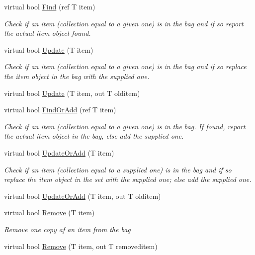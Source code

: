 \begin{DoxyCompactItemize}
virtual bool \hyperlink{class_c5_1_1_hash_bag_a596f1c7fdcc7867d3b93ffb18f106655}{Find} (ref T item)
\begin{DoxyCompactList}\small\item\em Check if an item (collection equal to a given one) is in the bag and if so report the actual item object found. \end{DoxyCompactList}\item 
virtual bool \hyperlink{class_c5_1_1_hash_bag_a261d215277e57859f6a3b0dba0f31db5}{Update} (T item)
\begin{DoxyCompactList}\small\item\em Check if an item (collection equal to a given one) is in the bag and if so replace the item object in the bag with the supplied one. \end{DoxyCompactList}\item 
virtual bool \hyperlink{class_c5_1_1_hash_bag_aa464499f571def3278fb29ffd49dc9d9}{Update} (T item, out T olditem)
\item 
virtual bool \hyperlink{class_c5_1_1_hash_bag_afc84f71f4abef8b7a96f8b5d9153a270}{Find\+Or\+Add} (ref T item)
\begin{DoxyCompactList}\small\item\em Check if an item (collection equal to a given one) is in the bag. If found, report the actual item object in the bag, else add the supplied one. \end{DoxyCompactList}\item 
virtual bool \hyperlink{class_c5_1_1_hash_bag_a7d04b71113870f6bbdd936fa778d1775}{Update\+Or\+Add} (T item)
\begin{DoxyCompactList}\small\item\em Check if an item (collection equal to a supplied one) is in the bag and if so replace the item object in the set with the supplied one; else add the supplied one. \end{DoxyCompactList}\item 
virtual bool \hyperlink{class_c5_1_1_hash_bag_a22061ab9c804125e28d56a4d32aa6ee7}{Update\+Or\+Add} (T item, out T olditem)
\item 
virtual bool \hyperlink{class_c5_1_1_hash_bag_aecff446396494ee3d10ee53f5bc78ce5}{Remove} (T item)
\begin{DoxyCompactList}\small\item\em Remove one copy af an item from the bag \end{DoxyCompactList}\item 
virtual bool \hyperlink{class_c5_1_1_hash_bag_a15514e59b510fc1e5d1d4b5bc3ca16c8}{Remove} (T item, out T removeditem)

\end{DoxyCompactItemize}
